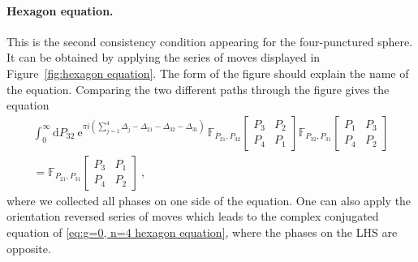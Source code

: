 \documentclass[12pt,a4paper]{article}
\renewcommand\d{\text{d}}
\begin{document}
\paragraph{Hexagon equation.} This is the second consistency condition appearing for the four-punctured sphere. It can be obtained by applying the series of moves displayed in Figure~\ref{fig:hexagon equation}. The form of the figure should explain the name of the equation. Comparing the two different paths through the figure gives the equation
\begin{multline}
            \int_0^\infty\!\! \d P_{32}\ \mathrm{e}^{\pi i (\sum_{j=1}^4\Delta_j-\Delta_{21}-\Delta_{32}-\Delta_{31})} \, \mathbb{F}_{P_{21},P_{32}} \!\begin{bmatrix}
            P_3 & P_2 \\
            P_4 & P_1
        \end{bmatrix}
        \mathbb{F}_{P_{32},P_{31}} \!\begin{bmatrix}
            P_1 & P_3 \\
            P_4 & P_2
        \end{bmatrix} \\
        =
        \mathbb{F}_{P_{21},P_{31}} \!\begin{bmatrix}
            P_3 & P_1 \\
            P_4 & P_2
        \end{bmatrix}\ , \label{eq:g=0, n=4 hexagon equation}
        \end{multline}
where we collected all phases on one side of the equation. One can also apply the orientation reversed series of moves which leads to the complex conjugated equation of \eqref{eq:g=0, n=4 hexagon equation}, where the phases on the LHS are opposite.
\end{document}
